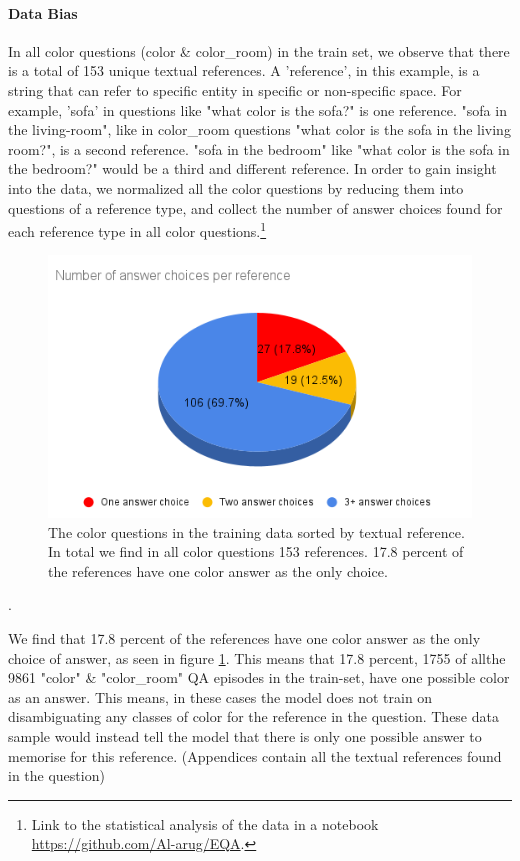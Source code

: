 \paragraph{Data Bias}

In all color questions (color & color\_room) in the train set, we observe that there is a total of 153  unique textual references. A 'reference', in this example, is a string that can refer to specific entity in specific or non-specific space. For example, 'sofa' in questions like "what color is the sofa?" is one reference. "sofa in the living-room", like in color\_room questions "what color is the sofa in the living room?", is a second reference. "sofa in the bedroom" like "what color is the sofa in the bedroom?" would be a third and different reference. In order to gain insight into the data, we normalized all the color questions by reducing them into questions of a reference type, and collect the number of answer choices found for each reference type in all color questions.\footnote{ Link to the statistical analysis of the data in a notebook  \url{https://github.com/Al-arug/EQA}.} 


\begin{figure}[H]
\centering
\includegraphics[scale=0.5]{latex/images/AnswerRef.png}
\caption{The color questions in the training data sorted by textual reference. In total we find in all color questions 153 references. 17.8 percent of the references have one color answer as the only choice.  }
\label{fig:AnswerRef}
\end{figure}.

We find that 17.8 percent of the references have one color answer as the only choice of answer, as seen in figure \ref{fig:AnswerRef}. This means that 17.8 percent, 1755 of allthe  9861 "color" & "color\_room" QA episodes in the train-set, have one possible color as an answer. This means, in these cases the model does not train on disambiguating any classes of color for the reference in the question. These data sample would instead tell the model that there is only one possible answer to memorise for this reference. (Appendices contain all the textual references found in the question)

